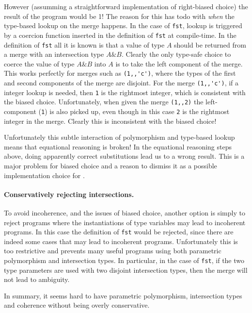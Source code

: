 However (assumming a straightforward implementation of right-biased
choice) the result of the program would be 1! The reason for this has
todo with \emph{when} the type-based lookup on the merge happens. In
the case of \lstinline{fst}, lookup is triggered by a coercion
function inserted in the definition of \lstinline{fst} at
compile-time.
In the definition of \lstinline$fst$ all it is known is that a
value of type $A$ should be returned from a merge with an intersection
type $A\&B$.  Clearly the only type-safe choice to coerce the value of
type $A\&B$ into $A$ is to
take the left component of the merge. This works perfectly for merges
such as \lstinline$(1,,'c')$, where the types of the first and second components
of the merge are disjoint. For the merge \lstinline$(1,,'c')$, if a integer lookup
is needed, then \lstinline$1$ is the rightmost integer, which is consistent with the
biased choice. Unfortunately, when given the merge \lstinline$(1,,2)$ the
left-component (\lstinline$1$) is also picked up, even though in this case \lstinline$2$
is the rightmost integer in the merge. Clearly this is inconsistent
with the biased choice!

Unfortunately this subtle interaction of polymorphism and type-based lookup
 means that equational reasoning is broken!
In the equational reasoning steps above, doing apparently correct
substitutions lead us to a wrong result. This is a major problem for
biased choice and a reason to dismiss it as a possible implementation
choice for \namedis.

\paragraph{Conservatively rejecting intersections.}
To avoid incoherence, and the issues of biased choice, another option
is simply to reject programs where the
instantiations of type variables may lead to incoherent programs.
In this case the definition of \lstinline$fst$ would be rejected, since there
are indeed some cases that may lead to incoherent programs.
Unfortunately this is too restrictive and prevents many useful
programs using both parametric polymorphism and intersection types.
In particular, in the case of \lstinline{fst}, if the two type
parameters are used with two disjoint intersection
types, then the merge will not lead to ambiguity.

In summary, it seems hard to have parametric polymorphism, intersection
types and coherence without being overly conservative.


